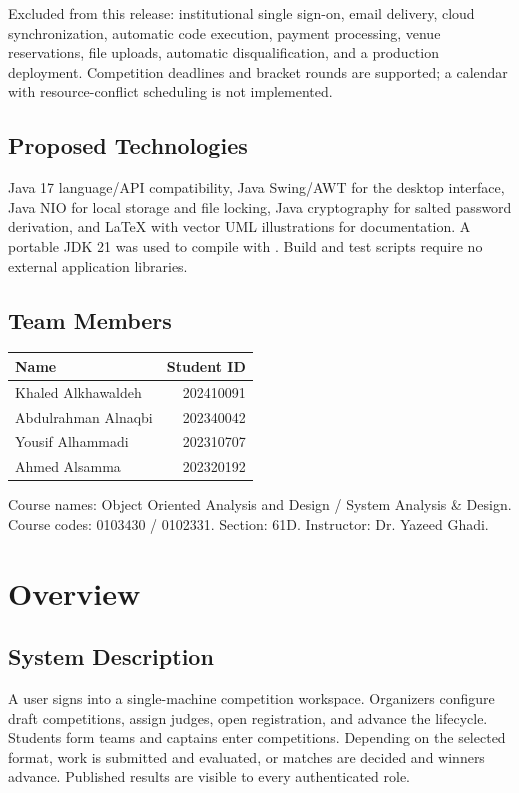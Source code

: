 Excluded from this release: institutional single sign-on, email delivery, cloud synchronization, automatic code execution, payment processing, venue reservations, file uploads, automatic disqualification, and a production deployment. Competition deadlines and bracket rounds are supported; a calendar with resource-conflict scheduling is not implemented.
\subsection{Proposed Technologies}
Java 17 language/API compatibility, Java Swing/AWT for the desktop interface, Java NIO for local storage and file locking, Java cryptography for salted password derivation, and LaTeX with vector UML illustrations for documentation. A portable JDK 21 was used to compile with . Build and test scripts require no external application libraries.
\subsection{Team Members}
\begin{tabularx}{\linewidth}{Yr}\toprule Name & Student ID\\\midrule
Khaled Alkhawaldeh & 202410091\\ Abdulrahman Alnaqbi & 202340042\\ Yousif Alhammadi & 202310707\\ Ahmed Alsamma & 202320192\\\bottomrule\end{tabularx}
Course names: Object Oriented Analysis and Design / System Analysis \& Design. Course codes: 0103430 / 0102331. Section: 61D. Instructor: Dr. Yazeed Ghadi.

\section{Overview}
\subsection{System Description}
A user signs into a single-machine competition workspace. Organizers configure draft competitions, assign judges, open registration, and advance the lifecycle. Students form teams and captains enter competitions. Depending on the selected format, work is submitted and evaluated, or matches are decided and winners advance. Published results are visible to every authenticated role.

